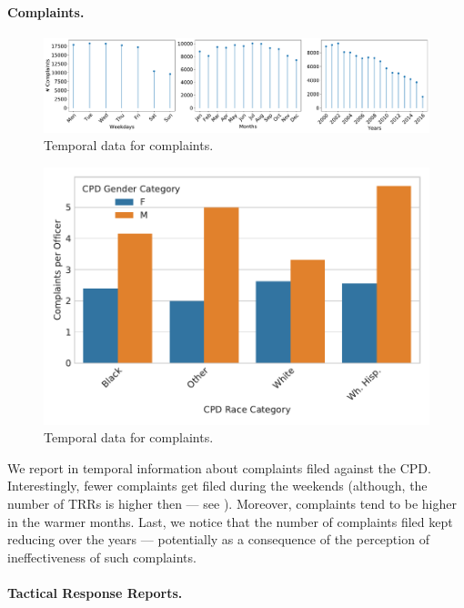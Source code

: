 \paragraph{Complaints.} 
\begin{figure}[h] 
	\includegraphics[width=\textwidth]{figs/complaints_times} 
	\caption{Temporal data for complaints.} \label{fig:complaints_times}
\end{figure}
\begin{figure}[h] 
	\includegraphics[width=\textwidth]{figs/complaints} 
	\caption{Temporal data for complaints.} \label{fig:complaints}
\end{figure}

We report in  temporal information about complaints filed against the CPD. Interestingly, fewer complaints get filed during the weekends (although, the number of TRRs is higher then --- see ). Moreover, complaints tend to be higher in the warmer months. Last, we notice that the number of complaints filed kept reducing over the years --- potentially as a consequence of the perception of ineffectiveness of such complaints.

\paragraph{Tactical Response Reports.}

